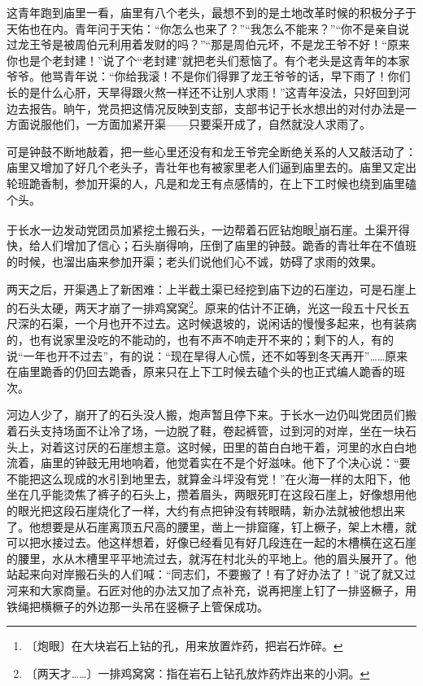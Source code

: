 \documentclass[12pt,UTF-8,openany]{ctexbook}
\begin{document}
\begin{normalsize}
    这青年跑到庙里一看，庙里有八个老头，最想不到的是土地改革时候的积极分子于天佑也在内。青年问于天佑：“你怎么也来了？”“我怎么不能来？”“你不是亲自说过龙王爷是被周伯元利用着发财的吗？”“那是周伯元坏，不是龙王爷不好！“原来你也是个老封建！”说了个“老封建”就把老头们惹恼了。有个老头是这青年的本家爷爷。他骂青年说：“你给我滚！不是你们得罪了龙王爷爷的话，早下雨了！你们长的是什么心肝，天旱得跟火熬一样还不让别人求雨！”这青年没法，只好回到河边去报告。晌午，党员把这情况反映到支部，支部书记于长水想出的对付办法是一方面说服他们，一方面加紧开渠——只要渠开成了，自然就没人求雨了。
    
    可是钟鼓不断地敲着，把一些心里还没有和龙王爷完全断绝关系的人又敲活动了：庙里又增加了好几个老头子，青壮年也有被家里老人们逼到庙里去的。庙里又定出轮班跪香制，参加开渠的人，凡是和龙王有点感情的，在上下工时候也绕到庙里磕个头。
    
    于长水一边发动党团员加紧挖土搬石头，一边帮着石匠钻炮眼\footnote{〔炮眼〕在大块岩石上钻的孔，用来放置炸药，把岩石炸碎。}崩石崖。土渠开得快，给人们增加了信心；石头崩得响，压倒了庙里的钟鼓。跪香的青壮年在不值班的时候，也溜出庙来参加开渠；老头们说他们心不诚，妨碍了求雨的效果。
    
    两天之后，开渠遇上了新困难：上半截土渠已经挖到庙下边的石崖边，可是石崖上的石头太硬，两天才崩了一排鸡窝窝\footnote{〔两天才……〕一排鸡窝窝：指在岩石上钻孔放炸药炸出来的小洞。}。原来的估计不正确，光这一段五十尺长五尺深的石渠，一个月也开不过去。这时候退坡的，说闲话的慢慢多起来，也有装病的，也有说家里没吃的不能动的，也有不声不响走开不来的；剩下的人，有的说“一年也开不过去”，有的说：“现在旱得人心慌，还不如等到冬天再开”……原来在庙里跪香的仍回去跪香，原来只在上下工时候去磕个头的也正式编人跪香的班次。
    
    河边人少了，崩开了的石头没人搬，炮声暂且停下来。于长水一边仍叫党团员们搬着石头支持场面不让冷了场，一边脱了鞋，卷起裤管，过到河的对岸，坐在一块石头上，对着这讨厌的石崖想主意。这时候，田里的苗白白地干着，河里的水白白地流着，庙里的钟鼓无用地响着，他觉着实在不是个好滋味。他下了个决心说：“要不能把这么现成的水引到地里去，就算金斗坪没有党！”在火海一样的太阳下，他坐在几乎能烫焦了裤子的石头上，攒着眉头，两眼死盯在这段石崖上，好像想用他的眼光把这段石崖烧化了一样，大约有点把钟没有转眼睛，新办法就被他想出来了。他想要是从石崖离顶五尺高的腰里，凿上一排窟窿，钉上橛子，架上木槽，就可以把水接过去。他这样想着，好像已经看见有好几段连在一起的木槽横在这石崖的腰里，水从木槽里平平地流过去，就泻在村北头的平地上。他的眉头展开了。他站起来向对岸搬石头的人们喊：“同志们，不要搬了！有了好办法了！”说了就又过河来和大家商量。石匠对他的办法又加了点补充，说再把崖上钉了一排竖橛子，用铁绳把横橛子的外边那一头吊在竖橛子上管保成功。
    

\end{normalsize}
\end{document}
